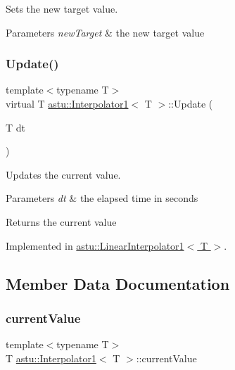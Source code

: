 Sets the new target value.


\begin{DoxyParams}{Parameters}
{\em new\+Target} & the new target value \\
\hline
\end{DoxyParams}
\mbox{\label{classastu_1_1Interpolator1_a3507ba0a1fcb2f38539793f1906d8000}} 
\subsubsection{\texorpdfstring{Update()}{Update()}}
{\footnotesize\ttfamily template$<$typename T$>$ \\
virtual T \hyperlink{classastu_1_1Interpolator1}{astu\+::\+Interpolator1}$<$ T $>$\+::Update (\begin{DoxyParamCaption}\item[{T}]{dt }\end{DoxyParamCaption})\hspace{0.3cm}{\ttfamily [pure virtual]}}

Updates the current value.


\begin{DoxyParams}{Parameters}
{\em dt} & the elapsed time in seconds \\
\hline
\end{DoxyParams}
\begin{DoxyReturn}{Returns}
the current value 
\end{DoxyReturn}


Implemented in \hyperlink{classastu_1_1LinearInterpolator1_a87cd49a1e029c8a4e7ca116c4dfae900}{astu\+::\+Linear\+Interpolator1$<$ T $>$}.



\subsection{Member Data Documentation}
\mbox{\label{classastu_1_1Interpolator1_a31df825a086aed6ad861c308e6061513}} 
\subsubsection{\texorpdfstring{current\+Value}{currentValue}}
{\footnotesize\ttfamily template$<$typename T$>$ \\
T \hyperlink{classastu_1_1Interpolator1}{astu\+::\+Interpolator1}$<$ T $>$\+::current\+Value\hspace{0.3cm}{\ttfamily [protected]}}

